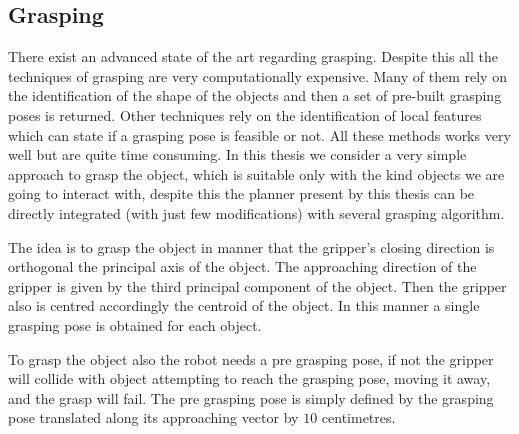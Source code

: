 

\subsection{Grasping}

There exist an advanced state of the art regarding grasping. Despite this all the techniques of grasping are very computationally expensive. Many of them rely on the identification of the shape of the objects and then a set of pre-built grasping poses is returned. Other techniques rely on the identification of local features which can state if a grasping pose is feasible or not. All these methods works very well but are quite time consuming. In this thesis we consider a very simple approach to grasp the object, which is suitable only with the kind objects we are going to interact with, despite this the planner present by this thesis can be directly integrated (with just few modifications) with several grasping algorithm. 

The idea is to grasp the object in manner that the gripper's closing direction is orthogonal the principal axis of the object. The approaching direction of the gripper is given by the third principal component of the object. Then the gripper also is centred accordingly the centroid of the object. 
In this manner a single grasping pose is obtained for each object. 


To grasp the object also the robot needs a pre grasping pose, if not the gripper will collide with object attempting to reach the grasping pose, moving it away, and the grasp will fail. The pre grasping pose is simply defined by the grasping pose translated along its approaching vector by $10$ centimetres.

